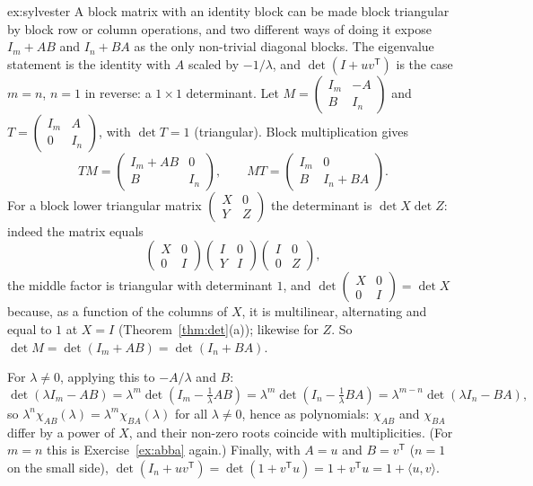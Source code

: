 \begin{solution}{ex:sylvester}
\idea A block matrix with an identity block can be made block triangular by block row or column operations, and two different ways of doing it expose $I_m+AB$ and $I_n+BA$ as the only non-trivial diagonal blocks. The eigenvalue statement is the identity with $A$ scaled by $-1/\lambda$, and $\det(I+uv^{\mathsf T})$ is the case $m=n$, $n=1$ in reverse: a $1\times1$ determinant.
\writeup Let $M=\begin{pmatrix}I_m&-A\\B&I_n\end{pmatrix}$ and $T=\begin{pmatrix}I_m&A\\0&I_n\end{pmatrix}$, with $\det T=1$ (triangular). Block multiplication gives
\[
TM=\begin{pmatrix}I_m+AB&0\\B&I_n\end{pmatrix},\qquad MT=\begin{pmatrix}I_m&0\\B&I_n+BA\end{pmatrix}.
\]
For a block lower triangular matrix $\begin{pmatrix}X&0\\Y&Z\end{pmatrix}$ the determinant is $\det X\det Z$: indeed the matrix equals
\[
\begin{pmatrix}X&0\\0&I\end{pmatrix}\begin{pmatrix}I&0\\Y&I\end{pmatrix}\begin{pmatrix}I&0\\0&Z\end{pmatrix},
\]
the middle factor is triangular with determinant $1$, and $\det\begin{pmatrix}X&0\\0&I\end{pmatrix}=\det X$ because, as a function of the columns of $X$, it is multilinear, alternating and equal to $1$ at $X=I$ (Theorem~\ref{thm:det}(a)); likewise for $Z$. So $\det M=\det(I_m+AB)=\det(I_n+BA)$.

For $\lambda\ne0$, applying this to $-A/\lambda$ and $B$:
\[
\det(\lambda I_m-AB)=\lambda^m\det\left(I_m-\tfrac1\lambda AB\right)=\lambda^m\det\left(I_n-\tfrac1\lambda BA\right)=\lambda^{m-n}\det(\lambda I_n-BA),
\]
so $\lambda^n\chi_{AB}(\lambda)=\lambda^m\chi_{BA}(\lambda)$ for all $\lambda\ne0$, hence as polynomials: $\chi_{AB}$ and $\chi_{BA}$ differ by a power of $X$, and their non-zero roots coincide with multiplicities. (For $m=n$ this is Exercise~\ref{ex:abba} again.) Finally, with $A=u$ and $B=v^{\mathsf T}$ ($n=1$ on the small side), $\det(I_n+uv^{\mathsf T})=\det(1+v^{\mathsf T}u)=1+v^{\mathsf T}u=1+\langle u,v\rangle$.
\end{solution}

